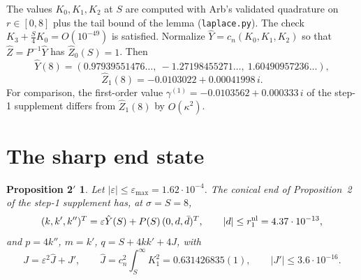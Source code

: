 \documentclass[11pt]{amsart}
\newtheorem*{propsharp}{Proposition 2$'$}
\theoremstyle{remark}
\newcommand{\eps}{\varepsilon}
\begin{document}
The values $K_0,K_1,K_2$ at $S$ are computed with Arb's validated quadrature on $r\in[0,8]$ plus the tail bound of the lemma (\texttt{laplace.py}). The check $K_3+\frac S4K_0=O(10^{-49})$ is satisfied. Normalize $\hat Y=c_n(K_0,K_1,K_2)$ so that $\hat Z=P^{-1}\hat Y$ has $\hat Z_0(S)=1$. Then
\[
\hat Y(8)=(0.97939551476\ldots,\ -1.27198455271\ldots,\ 1.60490957236\ldots),
\]
\[
\hat Z_1(8)=-0.0103022+0.00041998\,i .
\]
For comparison, the first-order value $\gamma^{(1)}=-0.0103562+0.000333\,i$ of the step-1 supplement differs from $\hat Z_1(8)$ by $O(\kappa^2)$.

\section{The sharp end state}
\begin{propsharp}
Let $|\eps|\le\eps_{\max}=1.62\cdot10^{-4}$. The conical end of Proposition~2 of the step-1 supplement has, at $\sigma=S=8$,
\[
(k,k',k'')^T=\eps\hat Y(S)+P(S)\,(0,d,\bar d)^T,\qquad |d|\le r_1^{\rm nl}=4.37\cdot10^{-13},
\]
and $p=4k''$, $m=k'$, $q=S+4kk'+4J$, with
\[
J=\eps^2\hat J+J',\qquad \hat J=c_n^2\int_S^\infty K_1^2=0.631426835(1),\qquad |J'|\le3.6\cdot10^{-16}.
\]
\end{propsharp}
\end{document}
